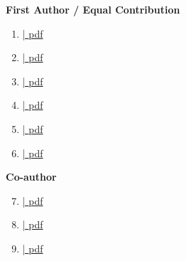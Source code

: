 


\begin{cvparagraph}
\textbf{First Author / Equal Contribution}

\begin{enumerate}
\item {}\label{paper:diffusion} \href{https://github.com/brambozz/publications/raw/main/pdf/2023medical.pdf}{| \textcolor{awesome}{pdf}}
\item {}\label{paper:midl} \href{https://github.com/brambozz/publications/raw/main/pdf/2021cine.pdf}{| \textcolor{awesome}{pdf}}
\item {}\label{paper:uncertainty} \href{https://github.com/brambozz/publications/raw/main/pdf/2022uncertainty.pdf}{| \textcolor{awesome}{pdf}}
\item {}\label{paper:hopping} \href{https://github.com/brambozz/publications/raw/main/pdf/2022hopping.pdf}{| \textcolor{awesome}{pdf}}
\item {}\label{paper:inter} \href{https://github.com/brambozz/publications/raw/main/pdf/2023inter.pdf}{| \textcolor{awesome}{pdf}}
\item {}\label{paper:quantifiable} \href{https://github.com/brambozz/publications/raw/main/pdf/2023quantifiable.pdf}{| \textcolor{awesome}{pdf}}
\end{enumerate}

\textbf{Co-author}
\begin{enumerate}
\setcounter{enumi}{6}
\item {}\label{paper:flare} \href{https://github.com/brambozz/publications/raw/main/pdf/2023flare.pdf}{| \textcolor{awesome}{pdf}}
\item {}\label{paper:covid} \href{https://github.com/brambozz/publications/raw/main/pdf/2021automated.pdf}{| \textcolor{awesome}{pdf}}
\item {}\label{paper:nature} \href{https://github.com/brambozz/publications/raw/main/pdf/2020classification.pdf}{| \textcolor{awesome}{pdf}}
\end{enumerate}
\end{cvparagraph}
